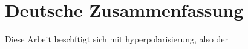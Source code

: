 \chapter{Deutsche Zusammenfassung}
Diese Arbeit besch\a ftigt sich mit hyperpolarisierung, also der 
